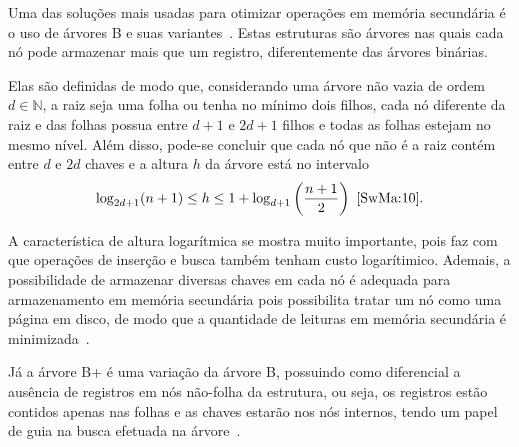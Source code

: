 \documentclass[12pt]{article}
\begin{document}
Uma das soluções mais usadas para otimizar operações em memória secundária é o
uso de árvores B e suas variantes~\cite{Co:79}. Estas estruturas são árvores
nas quais cada nó pode armazenar mais que um registro, diferentemente das
árvores binárias.

Elas são definidas de modo que, considerando uma árvore não vazia de ordem
$d \in \mathbb{N}$, a raiz seja uma folha ou tenha no mínimo dois filhos, cada
nó diferente da raiz e das folhas possua entre $d+1$ e $2d +1$ filhos e todas as
folhas estejam no mesmo nível.
Além disso, pode-se concluir que cada nó que não é a raiz contém entre $d$ e $2d$
chaves e a altura $h$ da árvore está no intervalo
\[ \log_{2d+1} (n+1) \leq h \leq 1 + \log_{d+1} \left(\frac{n + 1}{2}\right)~\cite{SwMa:10}. \]

A característica de altura logarítmica se mostra muito importante, pois faz com
que operações de inserção e busca também tenham custo logarítimico.
Ademais, a possibilidade de armazenar diversas chaves em cada nó é adequada para
armazenamento em memória secundária pois possibilita tratar um nó como uma página %
em disco, de modo que a quantidade de leituras em memória secundária é minimizada~\cite{Kn:98}.




Já a árvore B+ é uma variação da árvore B, possuindo como
diferencial a ausência de registros em nós não-folha da estrutura, ou seja,
os registros estão contidos apenas nas folhas e as chaves estarão nos nós internos,
tendo um papel de guia na busca efetuada na árvore~\cite{Pm:10}.
\end{document}
